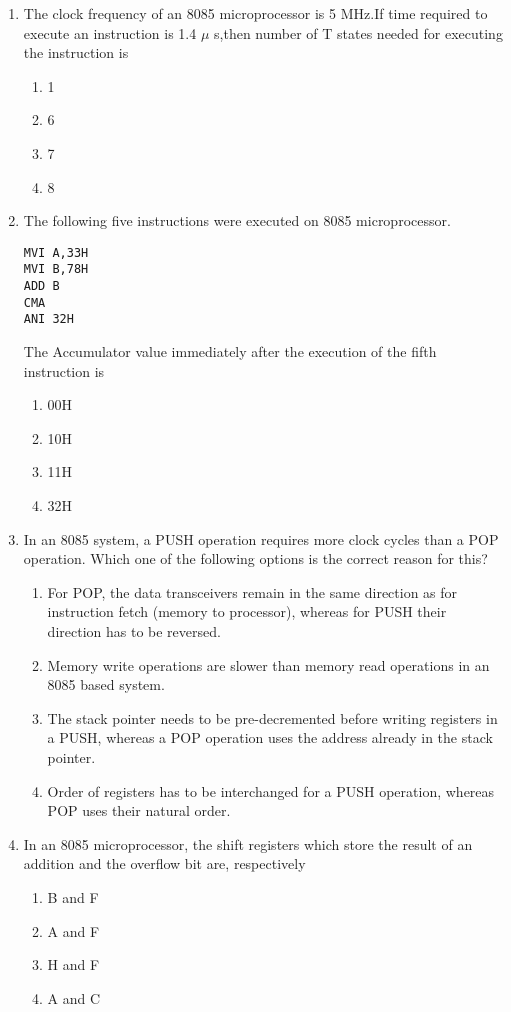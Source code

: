 \documentclass[journal,12pt,twocolumn]{IEEEtran}
\begin{document}
\begin{enumerate}
\item The clock frequency of an 8085 microprocessor is 5 MHz.If time required to execute an instruction is 1.4 $\mu$ s,then number of T states needed for executing the instruction is 

      \begin{enumerate}
      \item 1
      \item 6
      \item 7
      \item 8
      \end{enumerate}
     \item The following five instructions were executed on 8085 microprocessor.
\begin{verbatim}
MVI A,33H      
MVI B,78H        
ADD B
CMA
ANI 32H
\end{verbatim}
The Accumulator value immediately after the execution of the fifth instruction is

\begin{enumerate}
\item 00H \item 10H \item 11H \item 32H
\end{enumerate}
 
\item In an 8085 system, a PUSH operation requires more clock cycles than a POP operation. Which one
of the following options is the correct reason for this?
  
      \begin{enumerate}
      \item  For POP, the data transceivers remain in the same direction as for instruction fetch (memory to processor), whereas for PUSH their direction has to be reversed. 
      \item Memory write operations are slower than memory read operations in an 8085 based system.
      \item The stack pointer needs to be pre-decremented before writing registers in a PUSH, whereas a
POP operation uses the address already in the stack pointer.
      \item Order of registers has to be interchanged for a PUSH operation, whereas POP uses their natural order.
      \end{enumerate}
\item In an 8085 microprocessor, the shift registers which store the result of an addition and the overflow bit are, respectively
      \begin{enumerate}
      \item B and F
      \item A and F
      \item H and F
      \item A and C
      \end{enumerate}


\end{enumerate}
\end{document}
